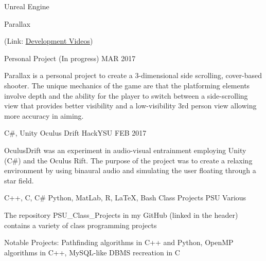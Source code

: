 
\begin{cventries}
	\cventry
	{{\color{awesome} Unreal Engine}} %
	{Parallax \begin{footnotesize}{(Link: \href{https://www.youtube.com/playlist?list=PLJCbmN5AjE1XUlgY5KwFnwDh3gmhvtiSC}{\color{awesome}\underline{Development Videos}})}\end{footnotesize}} %
	{Personal Project (In progress)} %
	{MAR 2017} %
	{
		\begin{cvitems} %
			\item {Parallax is a personal project to create a 3-dimensional side scrolling, cover-based shooter. The unique mechanics of the game are that the platforming elements involve depth and the ability for the player to switch between a side-scrolling view that provides better visibility and a low-visibility 3rd person view allowing more accuracy in aiming.}
		\end{cvitems}
	}
	\cventry
	{{\color{awesome} C\#, Unity}} %
	{Oculus Drift} %
	{HackYSU} %
	{FEB 2017} %
	{
		\begin{cvitems} %
			\item {OculusDrift was an experiment in audio-visual entrainment employing Unity (C\#) and the Oculus Rift. The purpose of the project was to create a relaxing environment by using binaural audio and simulating the user floating through a star field.}
		\end{cvitems}
	}
	\cventry
	{{\color{awesome} C++, C, C\# Python, MatLab, R, LaTeX, Bash}} %
	{Class Projects} %
	{PSU} %
	{Various} %
	{
	\begin{cvitems} %
		\item {The repository PSU\_Class\_Projects in my GitHub (linked in the header) contains a variety of class programming projects 
		\item Notable Projects: Pathfinding algorithms in C++ and Python, OpenMP algorithms in C++, MySQL-like DBMS recreation in C}
	\end{cvitems}
	}
\end{cventries}